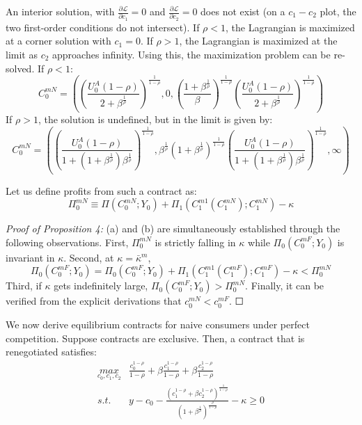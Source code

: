 \documentclass[11pt,english]{article}
\theoremstyle{plain}
\theoremstyle{definition}
\begin{document}
An interior solution, with $\frac{\partial\mathcal{L}}{\partial c_{1}}=0$
and $\frac{\partial\mathcal{L}}{\partial c_{2}}=0$ does not exist
(on a $c_{1}-c_{2}$ plot, the two first-order conditions do not intersect).
If $\rho<1$, the Lagrangian is maximized at a corner solution with
$c_{1}=0$. If $\rho>1$, the Lagrangian is maximized at the limit
as $c_{2}$ approaches infinity. Using this, the maximization problem
can be re-solved. If $\rho<1$: 
\begin{equation}
C_{0}^{mN}=\left(\left(\frac{U_{0}^{A}\left(1-\rho\right)}{2+\beta^{\frac{1}{\rho}}}\right)^{\frac{1}{1-\rho}},0,\left(\frac{1+\beta^{\frac{1}{\rho}}}{\beta}\right)^{\frac{1}{1-\rho}}\left(\frac{U_{0}^{A}\left(1-\rho\right)}{2+\beta^{\frac{1}{\rho}}}\right)^{\frac{1}{1-\rho}}\right)\label{eq:naive-monopolist-contract1}
\end{equation}
If $\rho>1$, the solution is undefined, but in the limit is given
by: 
\begin{equation}
C_{0}^{mN}=\left(\left(\frac{U_{0}^{A}\left(1-\rho\right)}{1+\left(1+\beta^{\frac{1}{\rho}}\right)\beta^{\frac{1}{\rho}}}\right)^{\frac{1}{1-\rho}},\beta^{\frac{1}{\rho}}\left(1+\beta^{\frac{1}{\rho}}\right)^{\frac{1}{1-\rho}}\left(\frac{U_{0}^{A}\left(1-\rho\right)}{1+\left(1+\beta^{\frac{1}{\rho}}\right)\beta^{\frac{1}{\rho}}}\right)^{\frac{1}{1-\rho}},\infty\right)\label{eq:naive-monopolist-contract2}
\end{equation}

Let us define profits from such a contract as: 
\[
\Pi_{0}^{mN}\equiv\Pi\left(C_{0}^{mN};Y_{0}\right)+\Pi_{1}\left(C_{1}^{m1}\left(C_{1}^{mN}\right);C_{1}^{mN}\right)-\kappa
\]

\emph{Proof of Proposition 4:} (a) and (b) are simultaneously established
through the following observations. First, $\Pi_{0}^{mN}$ is strictly
falling in $\kappa$ while $\Pi_{0}\left(C_{0}^{mF};Y_{0}\right)$
is invariant in $\kappa$. Second, at $\kappa=\bar{\kappa}^{m}$,
\begin{equation}
\Pi_{0}\left(C_{0}^{mF};Y_{0}\right)=\Pi_{0}\left(C_{0}^{mF};Y_{0}\right)+\Pi_{1}\left(C_{1}^{m1}\left(C_{1}^{mF}\right);C_{1}^{mF}\right)-\kappa<\Pi_{0}^{mN}
\end{equation}
Third, if $\kappa$ gets indefinitely large, $\Pi_{0}\left(C_{0}^{mF};Y_{0}\right)>\Pi_{0}^{mN}$.
Finally, it can be verified from the explicit derivations that $c_{0}^{mN}<c_{0}^{mF}$.
$\Square$

We now derive equilibrium contracts for naive consumers under perfect
competition. Suppose contracts are exclusive. Then, a contract that
is renegotiated satisfies: 
\begin{align}
\underset{c_{0},c_{1},c_{2}}{max} & \frac{c_{0}^{1-\rho}}{1-\rho}+\beta\frac{c_{1}^{1-\rho}}{1-\rho}+\beta\frac{c_{2}^{1-\rho}}{1-\rho}\\
s.t. & y-c_{0}-\frac{\left(c_{1}^{1-\rho}+\beta c_{2}^{1-\rho}\right)^{\frac{1}{1-\rho}}}{\left(1+\beta^{\frac{1}{\rho}}\right)^{\frac{\rho}{1-\rho}}}-\kappa\geq0
\end{align}
\end{document}
